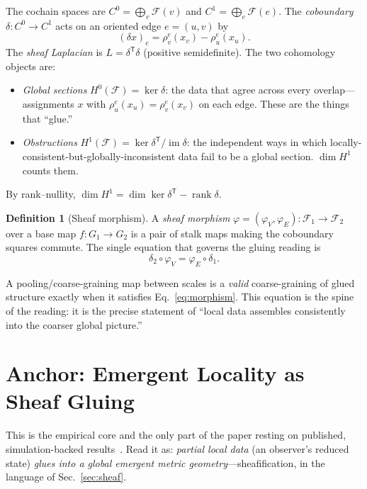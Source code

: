 \documentclass[aps,pra,twocolumn,superscriptaddress,floatfix]{revtex4-2}
\theoremstyle{definition}
\newtheorem{definition}{Definition}
\begin{document}
The cochain spaces are $C^0=\bigoplus_v\mathcal{F}(v)$ and
$C^1=\bigoplus_e\mathcal{F}(e)$. The \emph{coboundary} $\delta:C^0\to C^1$ acts
on an oriented edge $e=(u,v)$ by
\begin{equation}
(\delta x)_e=\rho^e_v(x_v)-\rho^e_u(x_u).
\label{eq:coboundary}
\end{equation}
The \emph{sheaf Laplacian} is $L=\delta^{\mathsf T}\delta$ (positive
semidefinite). The two cohomology objects are:
\begin{itemize}
\item \emph{Global sections} $H^0(\mathcal{F})=\ker\delta$: the data that agree
across every overlap---assignments $x$ with $\rho^e_u(x_u)=\rho^e_v(x_v)$ on
each edge. These are the things that ``glue.''
\item \emph{Obstructions} $H^1(\mathcal{F})=\ker\delta^{\mathsf T}/\operatorname{im}\delta$:
the independent ways in which locally-consistent-but-globally-inconsistent data
fail to be a global section. $\dim H^1$ counts them.
\end{itemize}
By rank--nullity, $\dim H^1=\dim\ker\delta^{\mathsf T}-\operatorname{rank}\delta$.

\begin{definition}[Sheaf morphism]
A \emph{sheaf morphism} $\varphi=(\varphi_V,\varphi_E):\mathcal{F}_1\to\mathcal{F}_2$
over a base map $f:G_1\to G_2$ is a pair of stalk maps making the coboundary
squares commute. The single equation that governs the gluing reading is
\begin{equation}
\delta_2\circ\varphi_V=\varphi_E\circ\delta_1.
\label{eq:morphism}
\end{equation}
\end{definition}

A pooling/coarse-graining map between scales is a \emph{valid} coarse-graining
of glued structure exactly when it satisfies Eq.~\eqref{eq:morphism}. This
equation is the spine of the reading: it is the precise statement of ``local
data assembles consistently into the coarser global picture.''

\section{Anchor: Emergent Locality as Sheaf Gluing}
\label{sec:anchor}

This is the empirical core and the only part of the paper resting on published,
simulation-backed results~\cite{glass2026plc1}. Read it as: \emph{partial local
data} (an observer's reduced state) \emph{glues into a global emergent metric
geometry}---sheafification, in the language of Sec.~\ref{sec:sheaf}.
\end{document}
